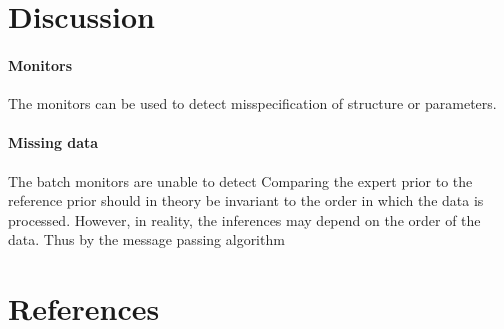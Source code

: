 \documentclass[12pt]{article}
\begin{document}

\section{Discussion}
 
\paragraph{Monitors}
The monitors can be used to detect misspecification of structure or parameters. 

\paragraph{Missing data} The batch monitors are unable to detect 
Comparing the expert prior to the reference prior should in theory be invariant to the order in which the data is processed. However, in reality, the inferences may depend on the order of the data. Thus by the message passing algorithm 

\section{References}  
\end{document}
